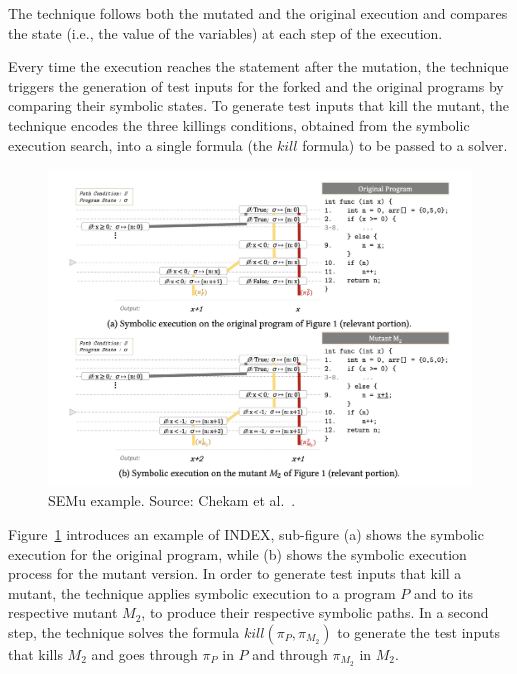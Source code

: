 The technique follows both the mutated and the original execution and compares the state (i.e., the value of the variables) at each step of the execution.

Every time the execution reaches the statement after the mutation, the technique triggers the generation of test inputs for the forked and the original programs by comparing their symbolic states. To generate test inputs that kill the mutant, the technique encodes the three killings conditions, obtained from the symbolic execution search, into a single formula (the $kill$ formula) to be passed to a solver.

\begin{figure}[tb]
\begin{center}
\includegraphics[width=\textwidth]{images/semu-example}
\caption{SEMu example. Source: Chekam et al.~\cite{chekam2021killing}.}
\label{fig:semu-example}
\end{center}
\end{figure}

Figure~\ref{fig:semu-example} introduces an example of INDEX, sub-figure (a) shows the symbolic execution for the original program, while (b) shows the symbolic execution process for the mutant version. In order to generate test inputs that kill a mutant, the technique applies symbolic execution to a program $P$ and to its respective mutant $M_2$, to produce their respective symbolic paths. In a second step, the technique solves the formula $kill(\pi_P, \pi_{M_2})$ to generate the test inputs that kills $M_2$ and goes through $\pi_P$ in $P$ and through $\pi_{M_2}$ in $M_2$. 

